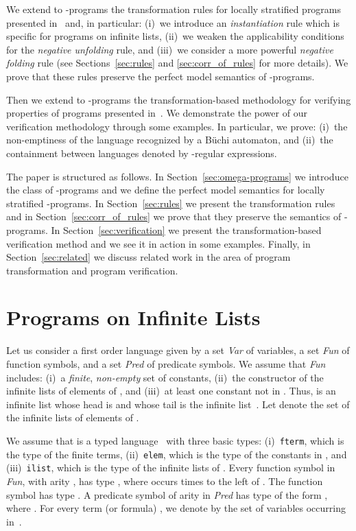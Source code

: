 \documentclass[english]{tlp}
\begin{document}
We extend to
-programs the transformation 
rules for locally stratified programs presented
in~\cite{Fi&04a,PeP00a,Ro&02,Sek91,Sek09} and, 
in particular: (i)~we introduce
an {\em instantiation\/} rule which is specific for programs on
infinite lists, (ii)~we weaken the applicability conditions for
the {\em  negative unfolding\/} rule, and 
(iii)~we consider a more powerful {\em negative
folding\/} rule (see Sections~\ref{sec:rules} and \ref{sec:corr_of_rules}
for more details).
We prove that these rules preserve
the perfect model semantics of -programs.

Then we extend to -programs the transformation-based
methodology for verifying properties of programs presented in~\cite{PeP00a}.
We  demonstrate the power of our verification methodology
through some examples. In particular, we prove: (i)~the non-emptiness of the
language recognized by a B\"uchi automaton,
 and (ii)~the containment between languages
denoted by -regular expressions.

The paper is structured as follows. In
Section~\ref{sec:omega-programs} we introduce the class of 
\mbox{-pro}{\-grams} and we define the perfect model semantics for locally stratified
\mbox{-programs}. In Section~\ref{sec:rules} we present the transformation rules
and in Section~\ref{sec:corr_of_rules} we prove that they preserve the  semantics of -programs. In Section~\ref{sec:verification} we
present the transformation-based verification method and we see it in action in
some examples. Finally, in Section~\ref{sec:related} we discuss related work in
the area of program transformation and program verification.



\section{Programs on Infinite Lists
\label{sec:omega-programs}}

Let us consider a first order language  given
by a set {\it{Var}} of variables, a set {\it{Fun}} of function
symbols, and a set {\it{Pred}} of predicate symbols. We assume that
{\it{Fun}} includes: (i)~a {\em finite}, {\em non-empty} set  of
constants, (ii)~the constructor  of the infinite lists of
elements of , and (iii)~at least one constant not in 
. Thus,  is an
infinite list whose head is  and whose tail is the
infinite list~. Let  denote the set of the
infinite lists of elements of .

We assume that  is a typed
language~\cite{Llo87} with three basic types:  (i)~\texttt{fterm},
which is the type of the finite terms, (ii)~\texttt{elem}, which is
the type of the constants in , and (iii)~\texttt{ilist},
which is the type of the infinite lists of .
Every function symbol in {\it{Fun}}, with arity , has type
, where  occurs  times to the left of
. The function symbol  has
type .
A predicate symbol of arity  in {\it{Pred}} has type
of the form , where
.
For every term  (or formula) ,
we denote by  
the set of variables occurring in~. 
\end{document}
